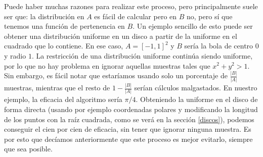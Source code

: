 \documentclass{scrbook}
\begin{document}
Puede haber muchas razones para realizar este proceso, pero principalmente suele ser que: la distribución en $A$ es fácil de calcular pero en $B$ no, pero sí que tenemos una función de pertenencia en $B$. Un ejemplo sencillo de esto puede ser obtener una distribución uniforme en un disco a partir de la uniforme en el cuadrado que lo contiene. En ese caso, $A=[-1,1]^2$ y $B$ sería la bola de centro $0$ y radio $1$. La restricción de una distribución uniforme continúa siendo uniforme, por lo que no hay problema en ignorar aquellas muestras tales que $x^2+y^2 > 1$. Sin embargo, es fácil notar que estaríamos usando solo un porcentaje de $\frac{|B|}{|A|}$ muestras, mientras que el resto de $1-\frac{|B|}{|A|}$ serían cálculos malgastados. En nuestro ejemplo, la eficacia del algoritmo sería $\pi/4$. Obteniendo la uniforme en el disco de forma directa (usando por ejemplo coordenadas polares y modificando la longitud de los puntos con la raíz cuadrada, como se verá en la sección \ref{discos}), podemos conseguir el cien por cien de eficacia, sin tener que ignorar ninguna muestra. Es por esto que decíamos anteriormente que este proceso es mejor evitarlo, siempre que sea posible.
\end{document}
